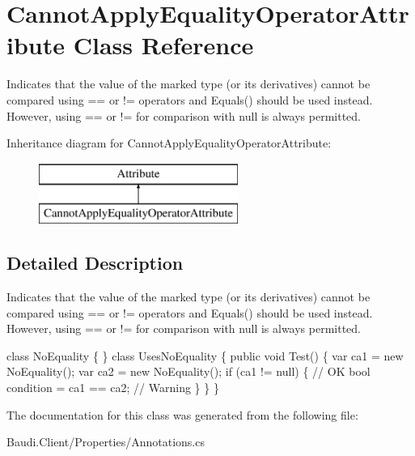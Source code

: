 \hypertarget{class_cannot_apply_equality_operator_attribute}{}\section{Cannot\+Apply\+Equality\+Operator\+Attribute Class Reference}
\label{class_cannot_apply_equality_operator_attribute}


Indicates that the value of the marked type (or its derivatives) cannot be compared using \textquotesingle{}==\textquotesingle{} or \textquotesingle{}!=\textquotesingle{} operators and {\ttfamily Equals()} should be used instead. However, using \textquotesingle{}==\textquotesingle{} or \textquotesingle{}!=\textquotesingle{} for comparison with {\ttfamily null} is always permitted.  


Inheritance diagram for Cannot\+Apply\+Equality\+Operator\+Attribute\+:\begin{figure}[H]
\begin{center}
\leavevmode
\includegraphics[height=2.000000cm]{class_cannot_apply_equality_operator_attribute}
\end{center}
\end{figure}


\subsection{Detailed Description}
Indicates that the value of the marked type (or its derivatives) cannot be compared using \textquotesingle{}==\textquotesingle{} or \textquotesingle{}!=\textquotesingle{} operators and {\ttfamily Equals()} should be used instead. However, using \textquotesingle{}==\textquotesingle{} or \textquotesingle{}!=\textquotesingle{} for comparison with {\ttfamily null} is always permitted. 


\begin{DoxyCode}
[CannotApplyEqualityOperator]
\textcolor{keyword}{class }NoEquality \{ \}
\textcolor{keyword}{class }UsesNoEquality \{
  \textcolor{keyword}{public} \textcolor{keywordtype}{void} Test() \{
    var ca1 = \textcolor{keyword}{new} NoEquality();
    var ca2 = \textcolor{keyword}{new} NoEquality();
    \textcolor{keywordflow}{if} (ca1 != null) \{ \textcolor{comment}{// OK}
      \textcolor{keywordtype}{bool} condition = ca1 == ca2; \textcolor{comment}{// Warning}
    \}
  \}
\}
\end{DoxyCode}


The documentation for this class was generated from the following file\+:\begin{DoxyCompactItemize}
\item 
Baudi.\+Client/\+Properties/Annotations.\+cs\end{DoxyCompactItemize}
